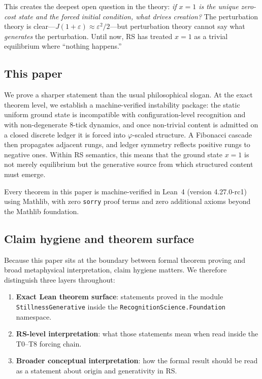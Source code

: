 \documentclass[11pt,a4paper]{article}
\newcommand{\Jcost}{J}
\newcommand{\phirs}{\varphi}
\begin{document}
This creates the deepest open question in the theory: \emph{if $x=1$ is the unique zero-cost state and the forced initial condition, what drives creation?}  The perturbation theory is clear---$\Jcost(1+\varepsilon)\approx\varepsilon^2/2$---but perturbation theory cannot say what \emph{generates} the perturbation.  Until now, RS has treated $x=1$ as a trivial equilibrium where ``nothing happens.''

\subsection{This paper}

We prove a sharper statement than the usual philosophical slogan.  At the exact theorem level, we establish a machine-verified instability package: the static uniform ground state is incompatible with configuration-level recognition and with non-degenerate 8-tick dynamics, and once non-trivial content is admitted on a closed discrete ledger it is forced into $\phirs$-scaled structure.  A Fibonacci cascade then propagates adjacent rungs, and ledger symmetry reflects positive rungs to negative ones.  Within RS semantics, this means that the ground state $x=1$ is not merely equilibrium but the generative source from which structured content must emerge.

Every theorem in this paper is machine-verified in Lean~4 (version 4.27.0-rc1) using Mathlib, with zero \texttt{sorry} proof terms and zero additional axioms beyond the Mathlib foundation.

\subsection{Claim hygiene and theorem surface}

Because this paper sits at the boundary between formal theorem proving and broad metaphysical interpretation, claim hygiene matters.  We therefore distinguish three layers throughout:
\begin{enumerate}[label=(\roman*)]
\item \textbf{Exact Lean theorem surface}: statements proved in the module \texttt{StillnessGenerative} inside the \texttt{RecognitionScience.Foundation} namespace.
\item \textbf{RS-level interpretation}: what those statements mean when read inside the T0--T8 forcing chain.
\item \textbf{Broader conceptual interpretation}: how the formal result should be read as a statement about origin and generativity in RS.
\end{enumerate}
\end{document}
